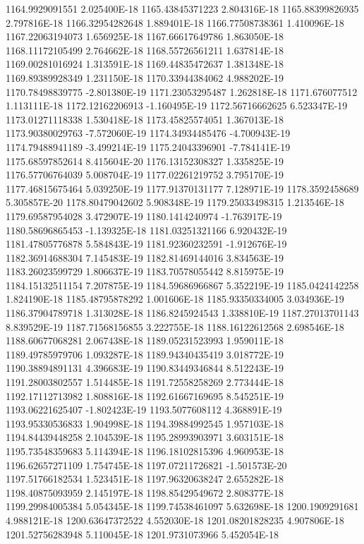 1164.9929091551  2.025400E-18
1165.43845371223  2.804316E-18
1165.88399826935  2.797816E-18
1166.32954282648  1.889401E-18
1166.77508738361  1.410096E-18
1167.22063194073  1.656925E-18
1167.66617649786  1.863050E-18
1168.11172105499  2.764662E-18
1168.55726561211  1.637814E-18
1169.00281016924  1.313591E-18
1169.44835472637  1.381348E-18
1169.89389928349  1.231150E-18
1170.33944384062  4.988202E-19
1170.78498839775  -2.801380E-19
1171.23053295487  1.262818E-18
1171.676077512  1.113111E-18
1172.12162206913  -1.160495E-19
1172.56716662625  6.523347E-19
1173.01271118338  1.530418E-18
1173.45825574051  1.367013E-18
1173.90380029763  -7.572060E-19
1174.34934485476  -4.700943E-19
1174.79488941189  -3.499214E-19
1175.24043396901  -7.784141E-19
1175.68597852614  8.415604E-20
1176.13152308327  1.335825E-19
1176.57706764039  5.008704E-19
1177.02261219752  3.795170E-19
1177.46815675464  5.039250E-19
1177.91370131177  7.128971E-19
1178.3592458689  5.305857E-20
1178.80479042602  5.908348E-19
1179.25033498315  1.213546E-18
1179.69587954028  3.472907E-19
1180.1414240974  -1.763917E-19
1180.58696865453  -1.139325E-18
1181.03251321166  6.920432E-19
1181.47805776878  5.584843E-19
1181.92360232591  -1.912676E-19
1182.36914688304  7.145483E-19
1182.81469144016  3.834563E-19
1183.26023599729  1.806637E-19
1183.70578055442  8.815975E-19
1184.15132511154  7.207875E-19
1184.59686966867  5.352219E-19
1185.0424142258  1.824190E-18
1185.48795878292  1.001606E-18
1185.93350334005  3.034936E-19
1186.37904789718  1.313028E-18
1186.8245924543  1.338810E-19
1187.27013701143  8.839529E-19
1187.71568156855  3.222755E-18
1188.16122612568  2.698546E-18
1188.60677068281  2.067438E-18
1189.05231523993  1.959011E-18
1189.49785979706  1.093287E-18
1189.94340435419  3.018772E-19
1190.38894891131  4.396683E-19
1190.83449346844  8.512243E-19
1191.28003802557  1.514485E-18
1191.72558258269  2.773444E-18
1192.17112713982  1.808816E-18
1192.61667169695  8.545251E-19
1193.06221625407  -1.802423E-19
1193.5077608112  4.368891E-19
1193.95330536833  1.904998E-18
1194.39884992545  1.957103E-18
1194.84439448258  2.104539E-18
1195.28993903971  3.603151E-18
1195.73548359683  5.114394E-18
1196.18102815396  4.960953E-18
1196.62657271109  1.754745E-18
1197.07211726821  -1.501573E-20
1197.51766182534  1.523451E-18
1197.96320638247  2.655282E-18
1198.40875093959  2.145197E-18
1198.85429549672  2.808377E-18
1199.29984005384  5.054345E-18
1199.74538461097  5.632698E-18
1200.1909291681  4.988121E-18
1200.63647372522  4.552030E-18
1201.08201828235  4.907806E-18
1201.52756283948  5.110045E-18
1201.9731073966  5.452054E-18
